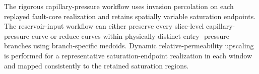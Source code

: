 The rigorous capillary-pressure workflow uses invasion percolation on each
replayed fault-core realization and retains spatially variable saturation
endpoints. The reservoir-input workflow can either preserve every slice-level
capillary-pressure curve or reduce curves within physically distinct entry-
pressure branches using branch-specific medoids. Dynamic relative-permeability
upscaling is performed for a representative saturation-endpoint realization
in each window and mapped consistently to the retained saturation regions.

